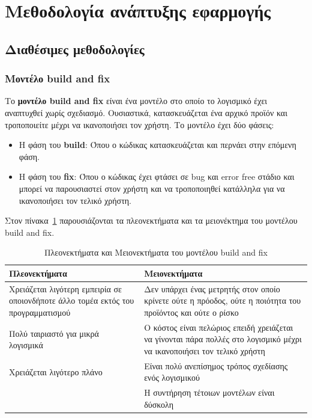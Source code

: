 \label{Chapter1}

\section{Μεθοδολογία ανάπτυξης εφαρμογής}

\subsection{Διαθέσιμες μεθοδολογίες}

\subsubsection{Μοντέλο build and fix}

Το \textbf{μοντέλο build and fix} είναι ένα μοντέλο στο οποίο το λογισμικό έχει
αναπτυχθεί χωρίς σχεδιασμό. Ουσιαστικά, κατασκευάζεται ένα αρχικό προϊόν και τροποποιείτε
μέχρι να ικανοποιήσει τον χρήστη. Το μοντέλο έχει δύο φάσεις:

\begin{itemize}
  \item Η φάση του \textbf{build}: Όπου ο κώδικας κατασκευάζεται
  και περνάει στην επόμενη φάση.
  \item Η φάση του \textbf{fix}: Όπου ο κώδικας έχει φτάσει σε bug και
  error free στάδιο και μπορεί να παρουσιαστεί στον χρήστη και να τροποποιηθεί
  κατάλληλα για να ικανοποιήσει τον τελικό χρήστη.
\end{itemize}

Στον πίνακα~\ref{tab:build_and_fix} παρουσιάζονται τα πλεονεκτήματα και τα μειονέκτημα του μοντέλου build and fix.

\begin{table}[H]
  \centering
  \begin{tabular}{| p{8cm} | p{8cm} |}
    \hline
    \textbf{Πλεονεκτήματα} & \textbf{Μειονεκτήματα} \\
    \hline
    Χρειάζεται λιγότερη εμπειρία σε οποιονδήποτε άλλο τομέα εκτός του προγραμματισμού & Δεν υπάρχει ένας μετρητής στον οποίο κρίνετε ούτε η πρόοδος, ούτε η ποιότητα του προϊόντος και ούτε ο ρίσκο \\
    \hline
    Πολύ ταιριαστό για μικρά λογισμικά &  Ο κόστος είναι πελώριος επειδή χρειάζεται να γίνονται πάρα πολλές στο λογισμικό μέχρι να ικανοποιήσει τον τελικό χρήστη \\
    \hline
    Χρειάζεται λιγότερο πλάνο & Είναι πολύ ανεπίσημος τρόπος σχεδίασης ενός λογισμικού \\
    \hline
    & Η συντήρηση τέτοιων μοντέλων είναι δύσκολη \\
    \hline
  \end{tabular}
  \caption{Πλεονεκτήματα και Μειονεκτήματα του μοντέλου build and fix}
  \label{tab:build_and_fix}
\end{table}

